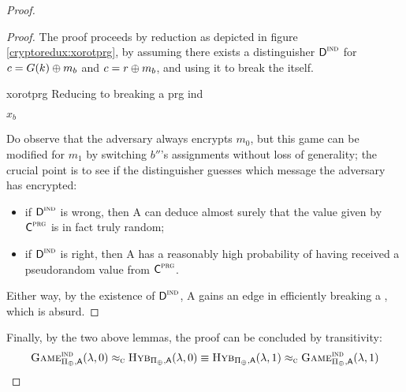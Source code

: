 \begin{proof}
    \begin{proof}
        The proof proceeds by reduction as depicted in figure \ref{cryptoredux:xorotprg}, by assuming there exists a distinguisher $\textsf{D}^{\textsc{ind}}$ for $c = G(k) \oplus m_{b}$ and $c = r \oplus m_{b}$, and using it to break the \prg{} itself.

        \begin{cryptoredux}
            {xorotprg}
            {Reducing to breaking a \prg}
            {prg}
            {ind}


            {$x_b$}{}

            
            

            

            \seqdelay


        \end{cryptoredux}

        Do observe that the adversary always encrypts $m_0$, but this game can be modified for $m_1$ by switching $b''$'s assignments without loss of generality; the crucial point is to see if the distinguisher guesses which message the adversary has encrypted:
        \begin{itemize}
            \item if $\textsf{D}^\textsc{ind}$ is wrong, then \textsf{A} can deduce almost surely that the value given by $\textsf{C}^\textsc{prg}$ is in fact truly random;
            \item if $\textsf{D}^\textsc{ind}$ is right, then \textsf{A} has a reasonably high probability of having received a pseudorandom value from $\textsf{C}^\textsc{prg}$.
        \end{itemize} 

        Either way, by the existence of $\textsf{D}^\textsc{ind}$, \textsf{A} gains an edge in efficiently breaking a \prg{}, which is absurd.
    \end{proof}

    Finally, by the two above lemmas, the proof can be concluded by transitivity:
    \[
        \textsc{Game}_{\Pi_{\oplus}, \textsf{A}}^{\textsc{ind}}(\lambda, 0) \approx_\textsc{c}
        \textsc{Hyb}_{\Pi_{\oplus}, \textsf{A}}(\lambda, 0) \equiv
        \textsc{Hyb}_{\Pi_{\oplus}, \textsf{A}}(\lambda, 1) \approx_\textsc{c}
        \textsc{Game}_{\Pi_{\oplus}, \textsf{A}}^{\textsc{ind}}(\lambda, 1)
    \]

\end{proof}
 

